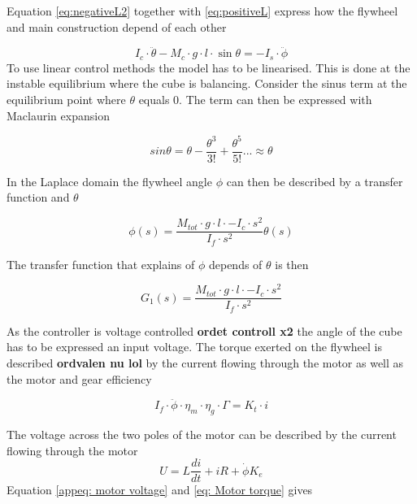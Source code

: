 \documentclass[a4paper,11pt]{kth-mag}
\begin{document}
Equation \ref{eq:negativeL2} together with \ref{eq:positiveL} express how the flywheel and main construction depend of each other

\begin{equation}
I_c \cdot \ddot{\theta} - M_c \cdot g \cdot l \cdot \sin \theta   = -I_s \cdot \ddot{\phi}
\end{equation}
To use linear control methods the model has to be linearised. This is done at the instable equilibrium where the cube is balancing. Consider the sinus term at the equilibrium point where $\theta$ equals $0$. The term can then be expressed with Maclaurin expansion

\begin{equation} \label{eq: sinus taylor}
sin \theta = \theta - \frac{\theta^3}{3!} +\frac{\theta^5}{5!}... \approx \theta 
\end{equation}

In the Laplace domain the flywheel angle $\phi$ can then be described by a transfer function and $\theta$

\begin{equation} \label{appeq: flywheelvscons}
\phi (s) = \frac{M_{tot} \cdot g \cdot l \cdot-I_c \cdot s^2}{I_f \cdot s^2}  \theta(s)
\end{equation}

The transfer function that explains of $\phi$ depends of $\theta$ is then

\begin{equation} \label{appeq: transferfunc1}
G_1(s) = \frac{M_{tot} \cdot g \cdot l \cdot-I_c \cdot s^2}{I_f \cdot s^2} 
\end{equation}

As the controller is voltage controlled \textbf{ordet controll x2} the angle of the cube has to be expressed an input voltage.
The torque exerted on the flywheel is described \textbf{ordvalen nu lol} by the current flowing through the motor as well as the motor and gear efficiency

\begin{equation}\label{eq: Motor torque}
I_f \cdot \ddot{\phi} \cdot \eta_m \cdot \eta_g \cdot \Gamma  = K_t \cdot i
\end{equation}

The voltage across the two poles of the motor can be described by the current flowing through the motor
\begin{equation} \label{appeq: motor voltage}
U = L\frac{di}{dt} + iR + \dot{\phi}K_e
\end{equation}
Equation \ref{appeq: motor voltage} and \ref{eq: Motor torque} gives 
\end{document}
